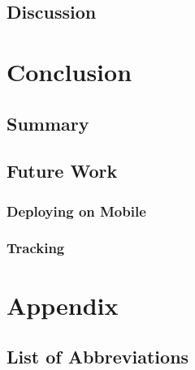 \documentclass[10pt]{book}
\begin{document}
\section{Discussion}


\chapter{Conclusion}
\label{chap:conclusion}

\section{Summary}

\section{Future Work}

\subsection{Deploying on Mobile}

\subsection{Tracking}

\chapter{Appendix}

\section{List of Abbreviations}
\end{document}
